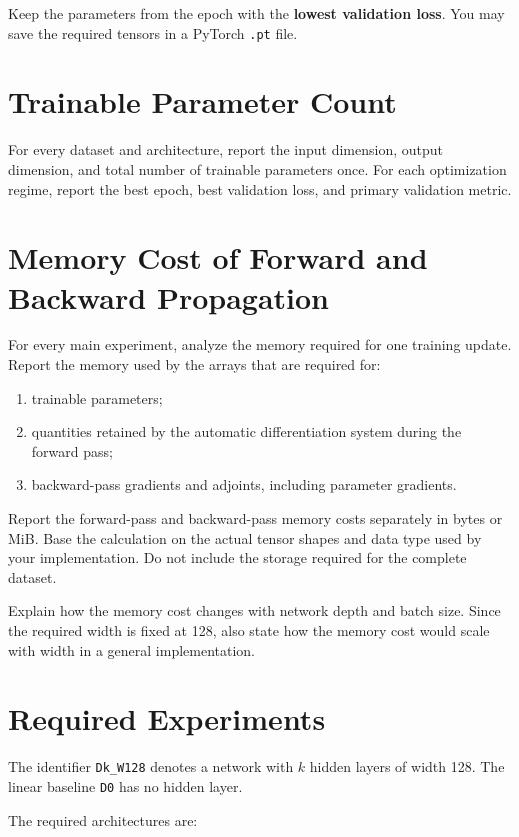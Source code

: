 \documentclass[11pt,a4paper]{article}
\newcommand{\code}[1]{\texttt{#1}}
\begin{document}
Keep the parameters from the epoch with the \textbf{lowest validation loss}. You may save the required tensors in a PyTorch \code{.pt} file.

\section{Trainable Parameter Count}

For every dataset and architecture, report the input dimension, output dimension, and total number of trainable parameters once. For each optimization regime, report the best epoch, best validation loss, and primary validation metric.

\section{Memory Cost of Forward and Backward Propagation}

For every main experiment, analyze the memory required for one training update. Report the memory used by the arrays that are required for:

\begin{enumerate}
    \item trainable parameters;
    \item quantities retained by the automatic differentiation system during the forward pass;
    \item backward-pass gradients and adjoints, including parameter gradients.
\end{enumerate}

Report the forward-pass and backward-pass memory costs separately in bytes or MiB. Base the calculation on the actual tensor shapes and data type used by your implementation. Do not include the storage required for the complete dataset.

Explain how the memory cost changes with network depth and batch size. Since the required width is fixed at 128, also state how the memory cost would scale with width in a general implementation.

\section{Required Experiments}

The identifier \code{Dk\_W128} denotes a network with $k$ hidden layers of width 128. The linear baseline \code{D0} has no hidden layer.

The required architectures are:
\end{document}
